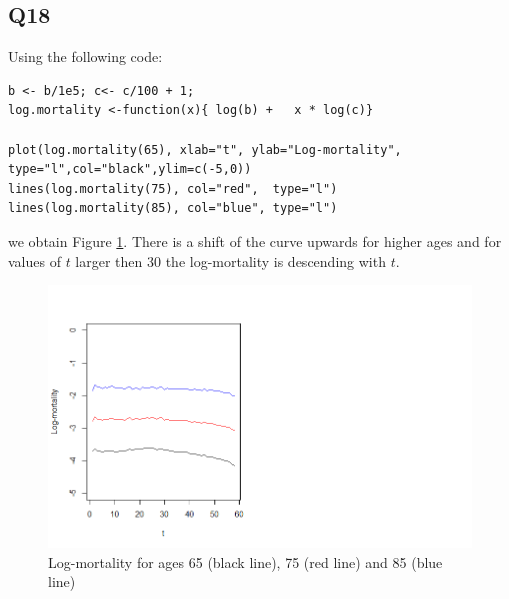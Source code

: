 \documentclass[11pt]{article}
\begin{document}
\subsection*{Q18}

Using the following code:
\begin{verbatim}
b <- b/1e5; c<- c/100 + 1;
log.mortality <-function(x){ log(b) + 	x * log(c)}

plot(log.mortality(65), xlab="t", ylab="Log-mortality", type="l",col="black",ylim=c(-5,0))
lines(log.mortality(75), col="red",  type="l")
lines(log.mortality(85), col="blue", type="l")
\end{verbatim}

we obtain Figure \ref{Figure_Question18}. There is a shift of the curve upwards for higher ages and for values of $t$ larger then 30 the log-mortality is descending with $t$.

\begin{center}
	\begin{figure}[H]
		
		\includegraphics[scale=0.60]{NL3_Question18.png}
		
		\caption{Log-mortality for ages 65 (black line), 75 (red line) and 85 (blue line)}
		\label{Figure_Question18}
		
	\end{figure}
\end{center}
\end{document}
